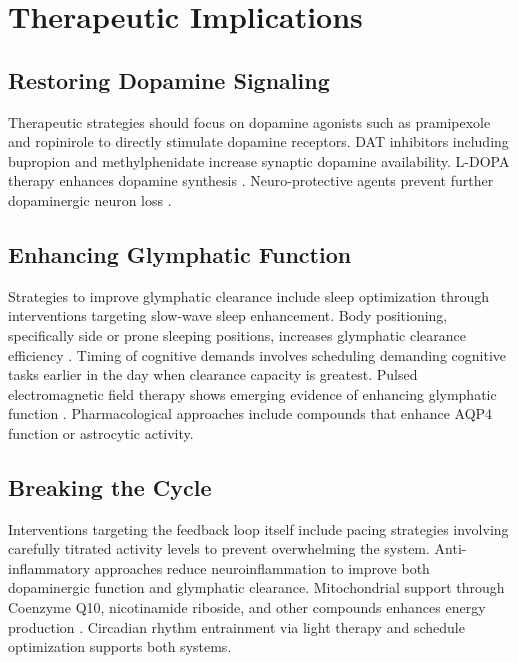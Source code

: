 \documentclass[12pt]{article}
\begin{document}
\section{Therapeutic Implications}

\subsection*{Restoring Dopamine Signaling}

Therapeutic strategies should focus on dopamine agonists such as pramipexole and ropinirole to directly stimulate dopamine receptors. DAT inhibitors including bupropion and methylphenidate increase synaptic dopamine availability. L-DOPA therapy enhances dopamine synthesis \citep{beauchamp2022parkinsonismwave, delprete2021parkinsoncovidimpact}. Neuro-protective agents prevent further dopaminergic neuron loss \citep{limanaqi2022dopamineregulation, nataf2020ddcace2}.

\subsection*{Enhancing Glymphatic Function}

Strategies to improve glymphatic clearance include sleep optimization through interventions targeting slow-wave sleep enhancement. Body positioning, specifically side or prone sleeping positions, increases glymphatic clearance efficiency \citep{Lee2015}. Timing of cognitive demands involves scheduling demanding cognitive tasks earlier in the day when clearance capacity is greatest. Pulsed electromagnetic field therapy shows emerging evidence of enhancing glymphatic function \citep{Dragicevic2021}. Pharmacological approaches include compounds that enhance AQP4 function or astrocytic activity.

\subsection*{Breaking the Cycle}

Interventions targeting the feedback loop itself include pacing strategies involving carefully titrated activity levels to prevent overwhelming the system. Anti-inflammatory approaches reduce neuroinflammation to improve both dopaminergic function and glymphatic clearance. Mitochondrial support through Coenzyme Q10, nicotinamide riboside, and other compounds enhances energy production \citep{stefano2021mitochondria}. Circadian rhythm entrainment via light therapy and schedule optimization supports both systems.
\end{document}
